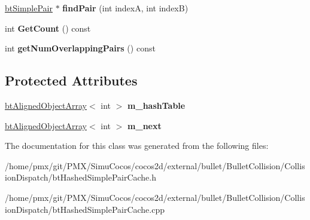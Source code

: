 \begin{DoxyCompactItemize}
\item 
\mbox{\label{classbtHashedSimplePairCache_a54c4151ee9ee6a69debf3cae174da452}} 
\hyperlink{structbtSimplePair}{bt\+Simple\+Pair} $\ast$ {\bfseries find\+Pair} (int indexA, int indexB)
\item 
\mbox{\label{classbtHashedSimplePairCache_a40bb08d90e09cfb15193499ea8d7c232}} 
int {\bfseries Get\+Count} () const
\item 
\mbox{\label{classbtHashedSimplePairCache_a84238355185d293a1749e5e00fd87895}} 
int {\bfseries get\+Num\+Overlapping\+Pairs} () const
\end{DoxyCompactItemize}
\subsection*{Protected Attributes}
\begin{DoxyCompactItemize}
\item 
\mbox{\label{classbtHashedSimplePairCache_a9159cf579172e9da9943724b4c3e0977}} 
\hyperlink{classbtAlignedObjectArray}{bt\+Aligned\+Object\+Array}$<$ int $>$ {\bfseries m\+\_\+hash\+Table}
\item 
\mbox{\label{classbtHashedSimplePairCache_aa136bae2095b06fb480d7a2fd78ef517}} 
\hyperlink{classbtAlignedObjectArray}{bt\+Aligned\+Object\+Array}$<$ int $>$ {\bfseries m\+\_\+next}
\end{DoxyCompactItemize}


The documentation for this class was generated from the following files\+:\begin{DoxyCompactItemize}
\item 
/home/pmx/git/\+P\+M\+X/\+Simu\+Cocos/cocos2d/external/bullet/\+Bullet\+Collision/\+Collision\+Dispatch/bt\+Hashed\+Simple\+Pair\+Cache.\+h\item 
/home/pmx/git/\+P\+M\+X/\+Simu\+Cocos/cocos2d/external/bullet/\+Bullet\+Collision/\+Collision\+Dispatch/bt\+Hashed\+Simple\+Pair\+Cache.\+cpp\end{DoxyCompactItemize}
